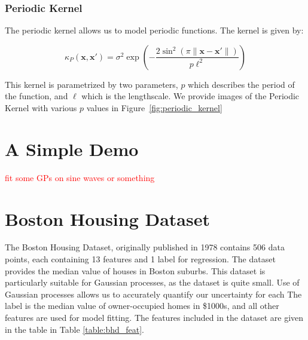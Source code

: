 \documentclass{article}
\newcommand{\bx}{\boldsymbol{x}}
\newcommand{\todo}[1]{\textcolor{red}{#1}}
\begin{document}
\subsubsection{Periodic Kernel}

The periodic kernel allows us to model periodic functions. The kernel is given by:

\[
  \kappa_{P}(\bx, \bx') = \sigma^{2}  \exp(- \frac{2 \sin^{2}(\pi \|\bx - \bx'\|)}{p \ell^{2}})
\]

This kernel is parametrized by two parameters, $p$ which describes the period of the function, and $\ell$ which is the
lengthscale\cite{duvenaud_automatic_2014}. We provide images of the Periodic Kernel with various $p$ values in
Figure~\ref{fig:periodic_kernel}


\section{A Simple Demo}

\todo{fit some GPs on sine waves or something}

\section{Boston Housing Dataset}

The Boston Housing Dataset, originally published in 1978 contains 506 data points, each containing 13 features and 1
label for regression\cite{harrison_hedonic_1978}. The dataset provides the median value of houses in Boston suburbs.
This dataset is particularly suitable for Gaussian processes, as the dataset is quite small. Use of Gaussian processes
allows us to accurately quantify our uncertainty for each The label is the median value of owner-occupied homes in \$1000s, and
all other features are used for model fitting. The features included in the dataset are given in the table in Table
\ref{table:bhd_feat}.
\end{document}
